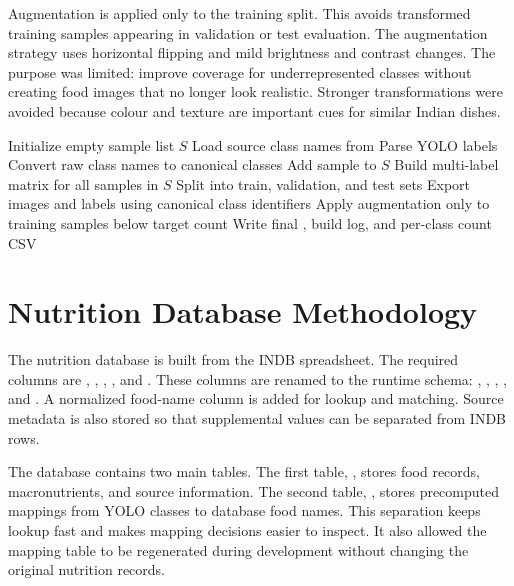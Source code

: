 Augmentation is applied only to the training split. This avoids transformed training samples appearing in validation or test evaluation. The augmentation strategy uses horizontal flipping and mild brightness and contrast changes. The purpose was limited: improve coverage for underrepresented classes without creating food images that no longer look realistic. Stronger transformations were avoided because colour and texture are important cues for similar Indian dishes.

\begin{algorithm}[H]
\caption{Dataset merge and export procedure}
\label{alg:dataset-merge}
\begin{algorithmic}[1]
\State Initialize empty sample list $S$
    \State Load source class names from 
        \State Parse YOLO labels
        \State Convert raw class names to canonical classes
        \State Add sample to $S$
    \EndFor
\EndFor
\State Build multi-label matrix for all samples in $S$
\State Split into train, validation, and test sets
\State Export images and labels using canonical class identifiers
\State Apply augmentation only to training samples below target count
\State Write final , build log, and per-class count CSV
\end{algorithmic}
\end{algorithm}

\section{Nutrition Database Methodology}

The nutrition database is built from the INDB spreadsheet. The required columns are , , , , and . These columns are renamed to the runtime schema: , , , , and . A normalized food-name column is added for lookup and matching. Source metadata is also stored so that supplemental values can be separated from INDB rows.

The database contains two main tables. The first table, , stores food records, macronutrients, and source information. The second table, , stores precomputed mappings from YOLO classes to database food names. This separation keeps lookup fast and makes mapping decisions easier to inspect. It also allowed the mapping table to be regenerated during development without changing the original nutrition records.


